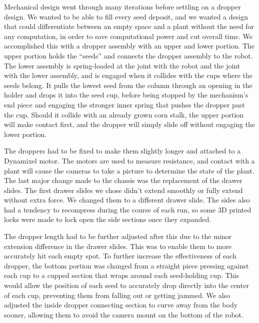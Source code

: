 \documentclass[11pt, twoside]{report}
\begin{document}
Mechanical design went through many iterations before settling on a dropper design.  We wanted to be able to fill every seed deposit, and we wanted a design that could differentiate between an empty space and a plant without the need for any computation, in order to save computational power and cut overall time.  We accomplished this with a dropper assembly with an upper and lower portion.  The upper portion holds the “seeds” and connects the dropper assembly to the robot.  The lower assembly is spring-loaded at the joint with the robot and the joint with the lower assembly, and is engaged when it collides with the cups where the seeds belong.  It pulls the lowest seed from the column through an opening in the holder and drops it into the seed cup, before being stopped by the mechanism’s end piece and engaging the stronger inner spring that pushes the dropper past the cup.  Should it collide with an already grown corn stalk, the upper portion will make contact first, and the dropper will simply slide off without engaging the lower portion.

The droppers had to be fixed to make them slightly longer and attached to a Dynamixel motor.  The motors are used to measure resistance, and contact with a plant will cause the cameras to take a picture to determine the state of the plant.  
The last major change made to the chassis was the replacement of the drawer slides.  The first drawer slides we chose didn’t extend smoothly or fully extend without extra force.  We changed them to a different drawer slide.  The sides also had a tendency to recompress during the course of each run, so some 3D printed locks were made to lock open the side sections once they expanded.

The dropper length had to be further adjusted after this due to the minor extension difference in the drawer slides.  This was to enable them to more accurately hit each empty spot. To further increase the effectiveness of each dropper, the bottom portion was changed from a straight piece pressing against each cup to a cupped section that wraps around each seed-holding cup.  This would allow the position of each seed to accurately drop directly into the center of each cup, preventing them from falling out or getting jammed.  We also adjusted the inside dropper connecting section to curve away from the body sooner, allowing them to avoid the camera mount on the bottom of the robot.
\end{document}
